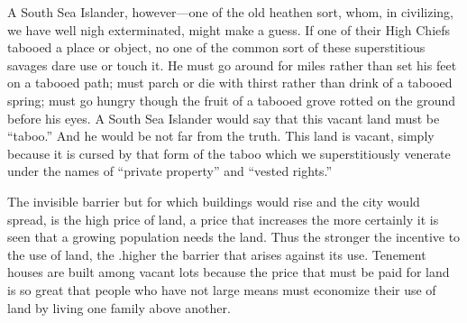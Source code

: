 \documentclass{book}
\begin{document}
A South Sea Islander, however—one of the old heathen sort, whom, in civilizing, we have well nigh exterminated, might make a guess. If one of their High Chiefs tabooed a place or object, no one of the common sort of these superstitious savages dare use or touch it. He must go around for miles rather than set his feet on a tabooed path; must parch or die with thirst rather than drink of a tabooed spring; must go hungry though the fruit of a tabooed grove rotted on the ground before his eyes. A South Sea Islander would say that this vacant land must be “taboo.” And he would be not far from the truth. This land is vacant, simply because it is cursed by that form of the taboo which we superstitiously venerate under the names of “private property” and “vested rights.”

The invisible barrier but for which buildings would rise and the city would spread, is the high price of land, a price that increases the more certainly it is seen that a growing population needs the land. Thus the stronger the incentive to the use of land, the .higher the barrier that arises against its use. Tenement houses are built among vacant lots because the price that must be paid for land is so great that people who have not large means must economize their use of land by living one family above another.
\end{document}
